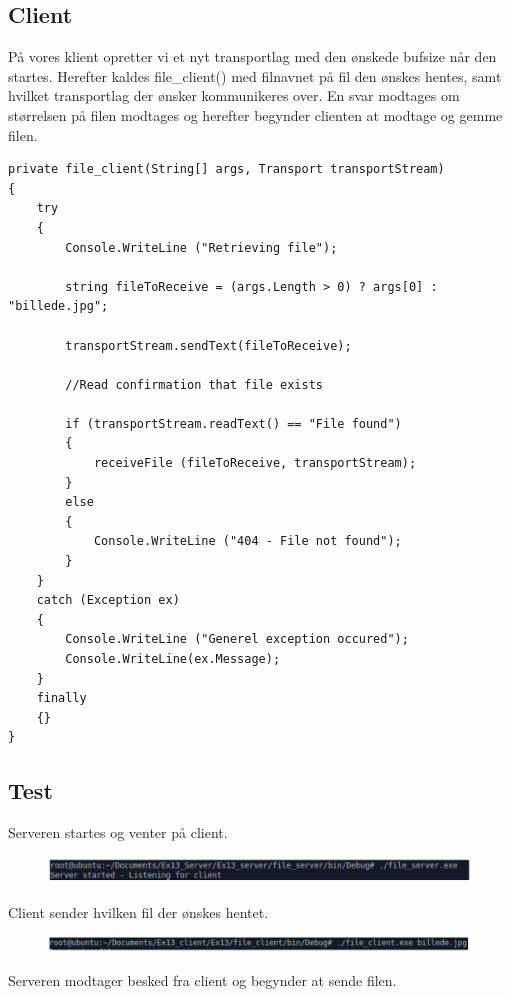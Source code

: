 \subsection{Client}
På vores klient opretter vi et nyt transportlag med den ønskede bufsize når den startes. Herefter kaldes
file_client() med filnavnet på fil den ønskes hentes, samt hvilket transportlag der ønsker kommunikeres
over. En svar modtages om størrelsen på filen modtages og herefter begynder clienten at modtage og
gemme filen.

\begin{lstlisting}
private file_client(String[] args, Transport transportStream)
{
	try
	{
		Console.WriteLine ("Retrieving file");
		
		string fileToReceive = (args.Length > 0) ? args[0] : "billede.jpg";
		
		transportStream.sendText(fileToReceive);
		
		//Read confirmation that file exists
		
		if (transportStream.readText() == "File found") 
		{
			receiveFile (fileToReceive, transportStream);
		} 
		else 
		{
			Console.WriteLine ("404 - File not found");
		}
	}
	catch (Exception ex)
	{
		Console.WriteLine ("Generel exception occured");
		Console.WriteLine(ex.Message);
	}
	finally 
	{}
}
\end{lstlisting}

\subsection{Test}
Serveren startes og venter på client.

\begin{figure}[h]
	\centering
	\includegraphics[width=0.7\linewidth]{figs/test1}
	\caption{}
	\label{fig:test1}
\end{figure}

Client sender hvilken fil der ønskes hentet.

\begin{figure}[h]
	\centering
	\includegraphics[width=0.7\linewidth]{figs/test2}
	\caption{}
	\label{fig:test2}
\end{figure}

Serveren modtager besked fra client og begynder at sende filen.

